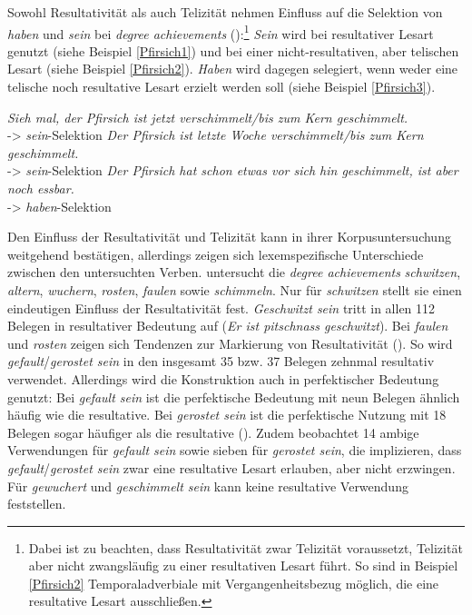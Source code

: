 Sowohl Resultativität als auch Telizität nehmen Einfluss auf die Selektion von \textit{haben} und \textit{sein} bei \textit{degree achievements} (\cite[252--264]{Gillmann.2016}):\footnote{Dabei ist zu beachten, dass Resultativität zwar Telizität voraussetzt, Telizität aber nicht zwangsläufig zu einer resultativen Lesart führt. So sind in Beispiel \ref{Pfirsich2} Temporaladverbiale mit Vergangenheitsbezug möglich, die eine resultative Lesart ausschließen.} \textit{Sein} wird bei resultativer Lesart genutzt (siehe Beispiel \ref{Pfirsich1}) und bei einer nicht-resultativen, aber telischen Lesart (siehe Beispiel \ref{Pfirsich2}). \textit{Haben} wird dagegen selegiert, wenn weder eine telische noch resultative Lesart erzielt werden soll (siehe Beispiel \ref{Pfirsich3}). 




\begin{exe}

\ex \label{Pfirsich1} \textit{Sieh mal, der Pfirsich ist jetzt verschimmelt/bis zum Kern geschimmelt.}\\  
\relax [+telisch] [+resultativ] -> \textit{sein}-Selektion
\ex \label{Pfirsich2} \textit{Der Pfirsich ist letzte Woche verschimmelt/bis zum Kern geschimmelt.}\\ 
\relax [+telisch] [-- resultativ] -> \textit{sein}-Selektion
\ex \label{Pfirsich3} \textit{Der Pfirsich hat schon etwas vor sich hin geschimmelt, ist aber noch essbar.} \\
\relax [-- telisch] [-- resultativ] -> \textit{haben}-Selektion
\end{exe}

Den Einfluss der Resultativität und Telizität kann \textcite[252--265]{Gillmann.2016} in ihrer Korpusuntersuchung weitgehend bestätigen, allerdings zeigen sich lexemspezifische Unterschiede zwischen den untersuchten Verben. \textcite[252--265]{Gillmann.2016} untersucht die \textit{degree achievements} \textit{schwitzen}, \textit{altern}, \textit{wuchern}, \textit{rosten}, \textit{faulen} sowie \textit{schimmeln}. Nur für \textit{schwitzen} stellt sie einen eindeutigen Einfluss der Resultativität fest. \textit{Geschwitzt sein} tritt in allen 112 Belegen in resultativer Bedeutung auf (\textit{Er ist pitschnass geschwitzt}). Bei \textit{faulen} und \textit{rosten} zeigen sich Tendenzen zur Markierung von Resultativität (\cite[257--258]{Gillmann.2016}). So wird \textit{gefault}/\textit{gerostet sein} in den insgesamt 35 bzw. 37 Belegen zehnmal resultativ verwendet. Allerdings wird die Konstruktion auch in perfektischer Bedeutung genutzt: Bei \textit{gefault sein} ist die perfektische Bedeutung mit neun Belegen ähnlich häufig wie die resultative. Bei \textit{gerostet sein} ist die perfektische Nutzung mit 18 Belegen sogar häufiger als die resultative  (\cite[256]{Gillmann.2016}). Zudem beobachtet \textcite[256--258]{Gillmann.2016} 14 ambige Verwendungen für \textit{gefault sein} sowie sieben für \textit{gerostet sein}, die implizieren, dass \textit{gefault}/\textit{gerostet sein} zwar eine resultative Lesart erlauben, aber nicht erzwingen. Für \textit{gewuchert} und \textit{geschimmelt sein} kann \textcite[256--258]{Gillmann.2016} keine resultative Verwendung feststellen.\largerpage[2]



